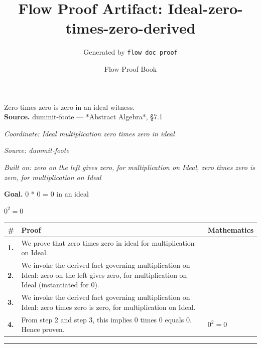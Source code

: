 \documentclass[11pt]{article}
\title{Flow Proof Artifact: Ideal-zero-times-zero-derived}
\author{Generated by \texttt{flow doc proof}}
\date{Flow Proof Book}
\theoremstyle{definition}
\begin{document}
\maketitle
Zero times zero is zero in an ideal witness.\\[0.5em]
\textbf{Source.} dummit-foote — *Abstract Algebra*, §7.1\\[0.5em]
\bigskip
{}\par
\smallskip\noindent\textit{Coordinate: Ideal \cdot multiplication \cdot zero times zero in ideal}\par
\smallskip\noindent\textit{Source: dummit-foote}\par
\smallskip\noindent\textit{Built on: zero on the left gives zero, for multiplication on Ideal, zero times zero is zero, for multiplication on Ideal}\par
\medskip
\noindent\textbf{Goal.} 0 * 0 = 0 in an ideal\par
\noindent$\displaystyle 0^{2} = 0$\par
\medskip
\noindent
\begin{tabular}{@{} >{\raggedright\arraybackslash}p{} >{\raggedright\arraybackslash}p{} >{\raggedleft\arraybackslash}p{} @{}}
\textbf{\#} & \textbf{Proof} & \textbf{Mathematics} \\
\midrule
\textbf{1.} & We prove that zero times zero in ideal for multiplication on Ideal. & \\[0.45em]
\textbf{2.} & We invoke the derived fact governing multiplication on Ideal: zero on the left gives zero, for multiplication on Ideal (instantiated for 0). & \\[0.45em]
\textbf{3.} & We invoke the derived fact governing multiplication on Ideal: zero times zero is zero, for multiplication on Ideal. & \\[0.45em]
\textbf{4.} & From step 2 and step 3, this implies 0 times 0 equals 0. Hence proven. & $\displaystyle 0^{2} = 0$ \\[0.45em]
\bottomrule
\end{tabular}
\label{thm:Ideal-multiplication-zero_times_zero_in_ideal}
\par\medskip\hrule
\end{document}
